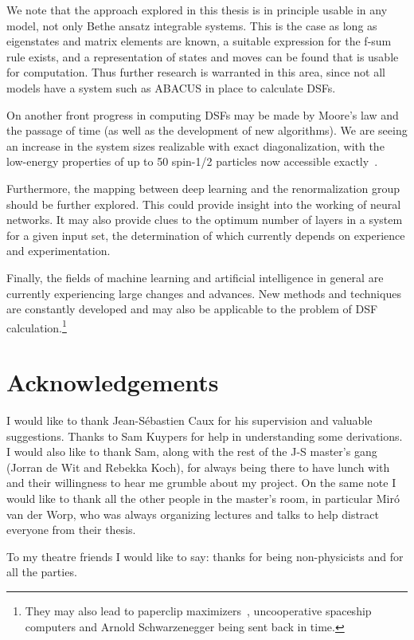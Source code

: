 \documentclass[11pt, a4paper]{report} %
\begin{document}
We note that the approach explored in this thesis is in principle usable in any model, not only Bethe ansatz integrable systems.
This is the case as long as eigenstates and matrix elements are known, a suitable expression for the f-sum rule exists, and a representation of states and moves can be found that is usable for computation.
Thus further research is warranted in this area, since not all models have a system such as ABACUS in place to calculate DSFs.

On another front progress in computing DSFs may be made by Moore's law and the passage of time (as well as the development of new algorithms).
We are seeing an increase in the system sizes realizable with exact diagonalization, with the low-energy properties of up to 50 spin-1/2 particles now accessible exactly~\cite{wietek18_sublat_codin_algor_distr_memor}.

Furthermore, the mapping between deep learning and the renormalization group~\cite{Mehta2014} should be further explored.
This could provide insight into the working of neural networks.
It may also provide clues to the optimum number of layers in a system for a given input set, the determination of which currently depends on experience and experimentation.

Finally, the fields of machine learning and artificial intelligence in general are currently experiencing large changes and advances.
New methods and techniques are constantly developed and may also be applicable to the problem of DSF calculation.\footnote{They may also lead to paperclip maximizers~\cite{tegmark}, uncooperative spaceship computers and Arnold Schwarzenegger being sent back in time.}

\section{Acknowledgements}
I would like to thank Jean-Sébastien Caux for his supervision and valuable suggestions.
Thanks to Sam Kuypers for help in understanding some derivations.
I would also like to thank Sam, along with the rest of the J-S master's gang (Jorran de Wit and Rebekka Koch), for always being there to have lunch with and their willingness to hear me grumble about my project.
On the same note I would like to thank all the other people in the master's room, in particular Miró van der Worp, who was always organizing lectures and talks to help distract everyone from their thesis.

To my theatre friends I would like to say: thanks for being non-physicists and for all the parties.
\end{document}
